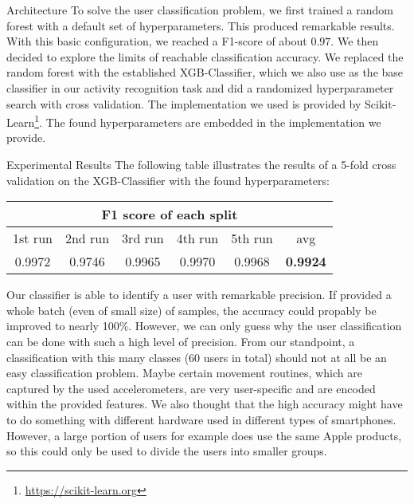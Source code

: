 \begin{subsection}{Architecture}
	To solve the user classification problem, we first trained a random forest with a default set of hyperparameters. This produced remarkable results. With this basic configuration, we reached a F1-score of about $0.97$. We then decided to explore the limits of reachable classification accuracy. We replaced the random forest with the established XGB-Classifier, which we also use as the base classifier in our activity recognition task and did a randomized hyperparameter search with cross validation. The implementation we used is provided by Scikit-Learn\footnote{\href{https://scikit-learn.org/stable/}{https://scikit-learn.org}}. The found hyperparameters are embedded in the implementation we provide.

\end{subsection}

\begin{subsection}{Experimental Results}
	The following table illustrates the results of a 5-fold cross validation on the XGB-Classifier with the found hyperparameters:
	
	\begin{center}
		\begin{tabular}{ |c|c|c|c|c|c|  }
			\hline
			\multicolumn{6}{|c|}{F1 score of each split} \\
			\hline
			1st run &2nd run &3rd run& 4th run & 5th run & avg\\
			\hline
			0.9972&0.9746&0.9965&0.9970&0.9968&\textbf{0.9924}\\

			\hline
		\end{tabular}
	\end{center}
	Our classifier is able to identify a user with remarkable precision. If provided a whole batch (even of small size) of samples, the accuracy could propably be improved to nearly 100\%. However, we can only guess why the user classification can be done with such a high level of precision. From our standpoint, a classification with this many classes (60 users in total) should not at all be an easy classification problem. Maybe certain movement routines, which are captured by the used accelerometers, are very user-specific and are encoded within the provided features. We also thought that the high accuracy might have to do something with different hardware used in different types of smartphones. However, a large portion of users for example does use the same Apple products, so this could only be used to divide the users into smaller groups. 
\end{subsection}
